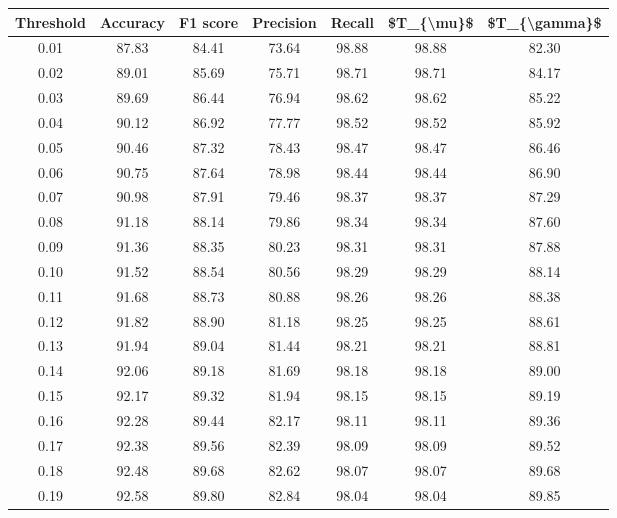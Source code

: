 \begin{tabular}{|c|c|c|c|c|c|c|}
\hline
 Threshold &  Accuracy &  F1 score &  Precision &  Recall &  \$T\_\{\textbackslash mu\}\$ &  \$T\_\{\textbackslash gamma\}\$ \\
\hline
      0.01 &     87.83 &     84.41 &      73.64 &   98.88 &      98.88 &         82.30 \\
      0.02 &     89.01 &     85.69 &      75.71 &   98.71 &      98.71 &         84.17 \\
      0.03 &     89.69 &     86.44 &      76.94 &   98.62 &      98.62 &         85.22 \\
      0.04 &     90.12 &     86.92 &      77.77 &   98.52 &      98.52 &         85.92 \\
      0.05 &     90.46 &     87.32 &      78.43 &   98.47 &      98.47 &         86.46 \\
      0.06 &     90.75 &     87.64 &      78.98 &   98.44 &      98.44 &         86.90 \\
      0.07 &     90.98 &     87.91 &      79.46 &   98.37 &      98.37 &         87.29 \\
      0.08 &     91.18 &     88.14 &      79.86 &   98.34 &      98.34 &         87.60 \\
      0.09 &     91.36 &     88.35 &      80.23 &   98.31 &      98.31 &         87.88 \\
      0.10 &     91.52 &     88.54 &      80.56 &   98.29 &      98.29 &         88.14 \\
      0.11 &     91.68 &     88.73 &      80.88 &   98.26 &      98.26 &         88.38 \\
      0.12 &     91.82 &     88.90 &      81.18 &   98.25 &      98.25 &         88.61 \\
      0.13 &     91.94 &     89.04 &      81.44 &   98.21 &      98.21 &         88.81 \\
      0.14 &     92.06 &     89.18 &      81.69 &   98.18 &      98.18 &         89.00 \\
      0.15 &     92.17 &     89.32 &      81.94 &   98.15 &      98.15 &         89.19 \\
      0.16 &     92.28 &     89.44 &      82.17 &   98.11 &      98.11 &         89.36 \\
      0.17 &     92.38 &     89.56 &      82.39 &   98.09 &      98.09 &         89.52 \\
      0.18 &     92.48 &     89.68 &      82.62 &   98.07 &      98.07 &         89.68 \\
      0.19 &     92.58 &     89.80 &      82.84 &   98.04 &      98.04 &         89.85 \\

\end{tabular}
